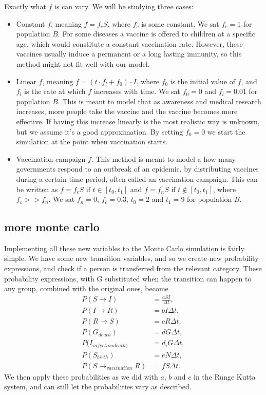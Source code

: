 \documentclass[a4paper]{article}
\let\Oldsubsection\subsection
\renewcommand{\subsection}{\FloatBarrier\Oldsubsection}
\begin{document}
	Exactly what $f$ is can vary. We will be studying three cases:
	\begin{itemize}
		\item Constant $f$, meaning $f = f_c S$, where $f_c$ is some constant. We sat $f_c = 1$ for population $B$. For some diseases a vaccine is offered to children at a specific age, which would constitute a constant vaccination rate. However, these vaccines usually induce a permanent or a long lasting immunity, so this method might not fit well with our model.
		\item Linear $f$, meaning $f = (t \cdot f_l + f_0) \cdot I$, where $f_0$ is the initial value of $f$, and $f_l$ is the rate at which $f$ increases with time. We sat $f_0 = 0$ and $f_l = 0.01$ for population $B$. 
		This is meant to model that as awareness and medical research increases, more people take the vaccine and the vaccine becomes more effective. If having this increase linearly is the most realistic way is unknown, but we assume it's a good approximation. By setting $f_0 = 0$ we start the simulation at the point when vaccination starts.
		\item Vaccination campaign $f$. This method is meant to model a how many governments respond to an outbreak of an epidemic, by distributing vaccines during a certain time period, often called an vaccination campaign. This can be written as $f = f_c S$ if $t \in [t_0,t_1]$ and $f = f_n S$ if $t \notin [t_0,t_1]$, where $f_c >> f_n$. We sat $f_n=0$, $f_c=0.3$, $t_0=2$ and $t_1=9$ for population $B$. 
	\end{itemize}
	
	\subsection{more monte carlo}
	Implementing all these new variables to the Monte Carlo simulation is fairly simple. We have some new transition variables, and so we create new probability expressions, and check if a person is transferred from the relevant category. These probability expressions, with G substituted when the transition can happen to any group, combined with the original ones, become
	\begin{align}
	P(S\rightarrow I) &= \frac{aSI}{\Delta t},\\
	P(I\rightarrow R) &= bI\Delta t,\\
	P(R\rightarrow S) &= cR\Delta t,\\
	P(G_{death}) &= dG\Delta t,\\
	P(I_{infection death)} &= d_iG\Delta t,\\
	P(S_{birth}) &= eN\Delta t,\\
	P(S\rightarrow_{vaccination} R) &= fS\Delta t.
	\end{align}
	We then apply these probabilities as we did with $a$, $b$ and $c$ in the Runge Kutta system, and can still let the probabilities vary as described.
	
\end{document}
